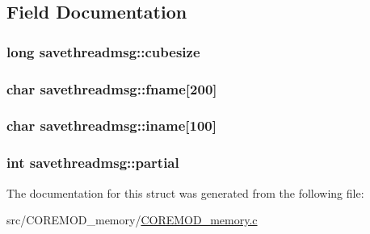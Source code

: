 \subsection{Field Documentation}
\hypertarget{structsavethreadmsg_aabe32dc91c33ab3536ad6d2b6730159f}{
\subsubsection[{cubesize}]{\setlength{\rightskip}{0pt plus 5cm}long savethreadmsg\+::cubesize}}\label{structsavethreadmsg_aabe32dc91c33ab3536ad6d2b6730159f}
\hypertarget{structsavethreadmsg_a86ce40d969ce095eb8ee5360b3298e8e}{
\subsubsection[{fname}]{\setlength{\rightskip}{0pt plus 5cm}char savethreadmsg\+::fname\mbox{[}200\mbox{]}}}\label{structsavethreadmsg_a86ce40d969ce095eb8ee5360b3298e8e}
\hypertarget{structsavethreadmsg_acd2174c7310a13ba8b782fe91b6bc3ab}{
\subsubsection[{iname}]{\setlength{\rightskip}{0pt plus 5cm}char savethreadmsg\+::iname\mbox{[}100\mbox{]}}}\label{structsavethreadmsg_acd2174c7310a13ba8b782fe91b6bc3ab}
\hypertarget{structsavethreadmsg_a67b95feb0e172459de37d4e23fab693b}{
\subsubsection[{partial}]{\setlength{\rightskip}{0pt plus 5cm}int savethreadmsg\+::partial}}\label{structsavethreadmsg_a67b95feb0e172459de37d4e23fab693b}


The documentation for this struct was generated from the following file\+:\begin{DoxyCompactItemize}
\item 
src/\+C\+O\+R\+E\+M\+O\+D\+\_\+memory/\hyperlink{COREMOD__memory_8c}{C\+O\+R\+E\+M\+O\+D\+\_\+memory.\+c}\end{DoxyCompactItemize}
